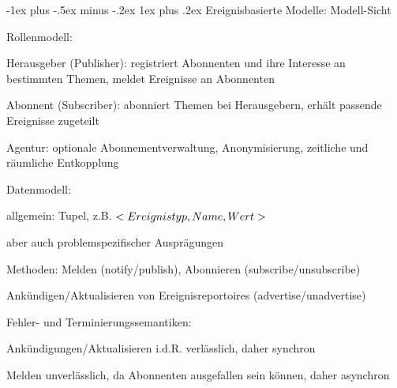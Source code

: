 \documentclass[10pt]{article}
\makeatletter
\renewcommand{\subsubsection}{\@startsection{subsubsection}{3}{0mm}%
                                {-1ex plus -.5ex minus -.2ex}%
                                {1ex plus .2ex}%
                                {\normalfont\small\bfseries}}
\makeatother
\begin{document}
\begin{itemize*}
\subsubsection{Ereignisbasierte Modelle: Modell-Sicht}
\begin{itemize*}
  \item Rollenmodell:
  \begin{itemize*}
    \item Herausgeber (Publisher): registriert Abonnenten und ihre Interesse an bestimmten Themen, meldet Ereignisse an Abonnenten
    \item Abonnent (Subscriber): abonniert Themen bei Herausgebern, erhält passende Ereignisse zugeteilt
    \item Agentur: optionale Abonnementverwaltung, Anonymisierung, zeitliche und räumliche Entkopplung
  \end{itemize*}
  \item Datenmodell:
  \begin{itemize*}
    \item allgemein: Tupel, z.B. $<Ereignistyp,\space Name,\space Wert>$
    \item aber auch problemspezifischer Ausprägungen
    \item Methoden: Melden (notify/publish), Abonnieren (subscribe/unsubscribe)
    \item Ankündigen/Aktualisieren von Ereignisreportoires (advertise/unadvertise)
  \end{itemize*}
  \item Fehler- und Terminierungssemantiken:
  \begin{itemize*}
    \item Ankündigungen/Aktualisieren i.d.R. verlässlich, daher synchron
    \item Melden unverlässlich, da Abonnenten ausgefallen sein können, daher asynchron
  \end{itemize*}
\end{itemize*}

\end{itemize*}
\end{document}
